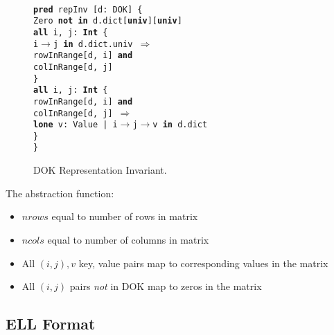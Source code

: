\documentclass[11pt,conference]{IEEEtran}
\newenvironment{myquote}{\list{}{\leftmargin=12pt\rightmargin=0pt}\item[]}{\endlist}
\def\TA{\makebox[12pt]{}}
\def\TB{\makebox[24pt]{}}
\def\TC{\makebox[36pt]{}}
\def\Bpred{\textbf{pred} }
\def\Ball{\textbf{all} }
\def\Bin{\textbf{in} }
\def\Band{\textbf{and} }
\def\Bnot{\textbf{not} }
\def\Bimplies{$\Rightarrow$ }
\def\Bint{\textbf{Int}}
\def\Buniv{\textbf{univ}}
\def\Blone{\textbf{lone} }
\begin{document}
\begin{figure}
\centering
\begin{myquote}\small{\texttt{\\
\Bpred repInv [d: DOK] \{\\
\TA Zero \Bnot \Bin d.dict[\Buniv][\Buniv]\\
\TA \Ball i, j: \Bint~\{\\
\TB i$\rightarrow$j \Bin d.dict.univ \Bimplies\\
\TC rowInRange[d, i] \Band\\
\TC colInRange[d, j]\\
\TA \}\\
\TA \Ball i, j: \Bint~\{\\
\TB rowInRange[d, i] \Band\\
\TB colInRange[d, j] \Bimplies\\
\TC \Blone v: Value | i$\rightarrow$j$\rightarrow$v \Bin d.dict\\
\TA \}\\
\}\\
}}
\end{myquote}
\caption{DOK Representation Invariant.}
\label{model:dokrep}
\end{figure}


The abstraction function:

\begin{itemize}
  \item \(nrows\) equal to number of rows in matrix
  \item \(ncols\) equal to number of columns in matrix
  \item All \((i, j), v\) key, value pairs map to corresponding values in the matrix
  \item All \((i, j)\) pairs \emph{not} in DOK map to zeros in the matrix
\end{itemize}

\subsection{ELL Format}
\end{document}
